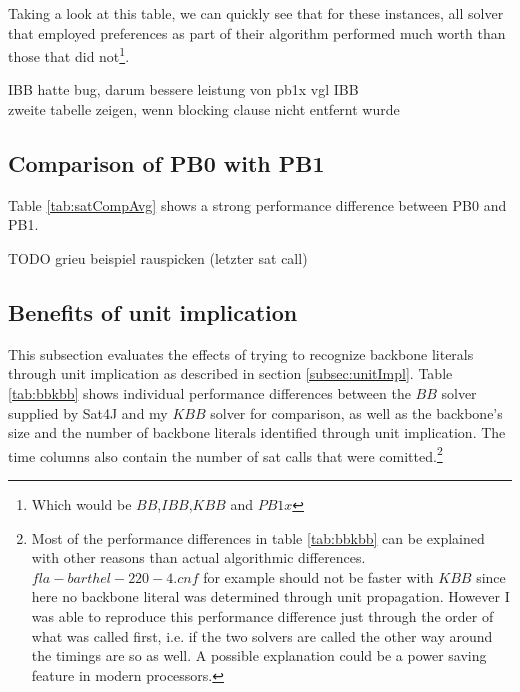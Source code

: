 Taking a look at this table, we can quickly see that for these instances, all solver that employed preferences as part of their algorithm performed much worth than those that did not\footnote{Which would be $BB$,$IBB$,$KBB$ and $PB1x$}.

IBB hatte bug, darum bessere leistung von pb1x vgl IBB\\
zweite tabelle zeigen, wenn blocking clause nicht entfernt wurde

\subsection{Comparison of PB0 with PB1}
Table \ref{tab:satCompAvg} shows a strong performance difference between PB0 and PB1.

TODO grieu beispiel rauspicken (letzter sat call)

\subsection{Benefits of unit implication}

This subsection evaluates the effects of trying to recognize backbone literals through unit implication as described in section \ref{subsec:unitImpl}. Table \ref{tab:bbkbb} shows individual performance differences between the $BB$ solver supplied by Sat4J and my $KBB$ solver for comparison, as well as the backbone's size and the number of backbone literals identified through unit implication. The time columns also contain the number of sat calls that were comitted.\footnote{Most of the performance differences in table \ref{tab:bbkbb} can be explained with other reasons than actual algorithmic differences. $fla-barthel-220-4.cnf$ for example should not be faster with $KBB$ since here no backbone literal was determined through unit propagation. However I was able to reproduce this performance difference just through the order of what was called first, i.e. if the two solvers are called the other way around the timings are so as well. A possible explanation could be a power saving feature in modern processors.}

